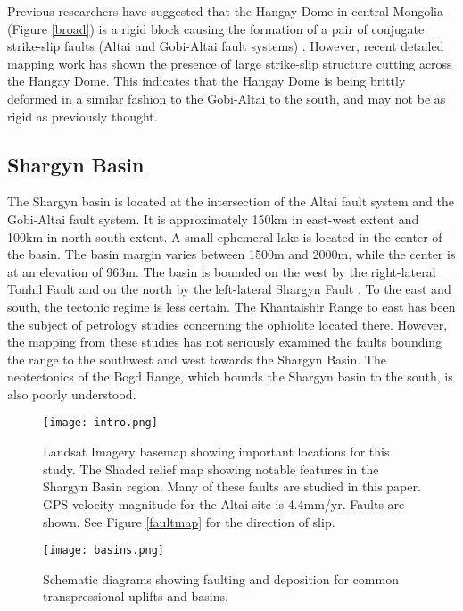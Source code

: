 	Previous researchers have suggested that the Hangay Dome in central Mongolia (Figure \ref{broad}) is a rigid block causing the formation of a pair of conjugate strike-slip faults (Altai and Gobi-Altai fault systems) \citep{Cunningham2005a}. However, recent detailed mapping work has shown the presence of large strike-slip structure cutting across the Hangay Dome. This indicates that the Hangay Dome is being brittly deformed in a similar fashion to the Gobi-Altai to the south, and may not be as rigid as previously thought\citep{Walker2006}\citep{Walker2007}\citep{Walker2008}.

\subsection{Shargyn Basin}

	The Shargyn basin is located at the intersection of the Altai fault system and the Gobi-Altai fault system. It is approximately 150km in east-west extent and 100km in north-south extent. A small ephemeral lake is located in the center of the basin. The basin margin varies between 1500m and 2000m, while the center is at an elevation of 963m. The basin is bounded on the west by the right-lateral Tonhil Fault and on the north by the left-lateral Shargyn Fault \citep{Cunningham2003}. To the east and south, the tectonic regime is less certain. The Khantaishir Range to east has been the subject of petrology studies concerning the ophiolite located there. However, the mapping from these studies has not seriously examined the faults bounding the range to the southwest and west towards the Shargyn Basin.  The neotectonics of the Bogd Range, which bounds the Shargyn basin to the south, is also poorly understood.

\begin{figure}[h!]
	\centering
	\texttt{[image: intro.png]}
	\caption{Landsat Imagery basemap showing important locations for this study. The Shaded relief map showing notable features in the Shargyn Basin region. Many of these faults are studied in this paper. GPS velocity magnitude for the Altai site is 4.4mm/yr. Faults are shown. See Figure \ref{faultmap} for the direction of slip.}
	\label{regional}
\end{figure}
	
	
\begin{figure}[h!]
  \centering
  \texttt{[image: basins.png]}
  \caption{Schematic diagrams showing faulting and deposition for common transpressional uplifts and basins.}
  \label{basintypes}
\end{figure}


